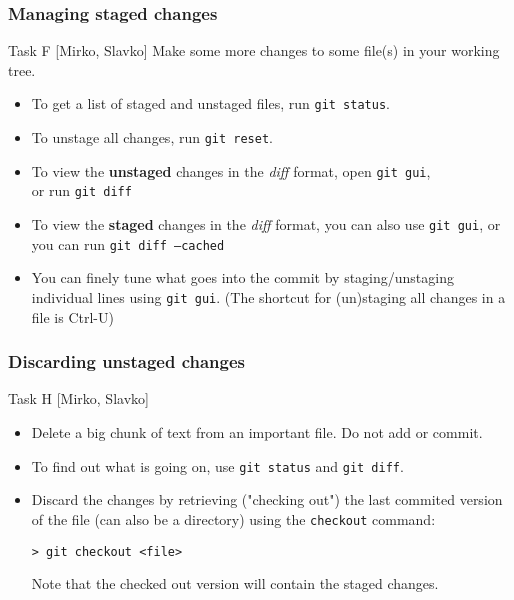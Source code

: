 \begin{frame}

\frametitle{Managing staged changes}

	\begin{block}{Task F [Mirko, Slavko]}
	Make some more changes to some file(s) in your working tree.
	\end{block}
	\begin{itemize}	
	
	\item To get a list of staged and unstaged files, run \texttt{git status}.
	\item To unstage all changes, run \texttt{git reset}.
	\item To view the \textbf{unstaged} changes in the \textit{diff} format, open \texttt{git gui}, 
	\\or run \texttt{git diff}

	\item To view the \textbf{staged} changes in the \textit{diff} format, you can also use \texttt{git gui}, or you can run \texttt{git diff --cached}
	
	\item You can finely tune what goes into the commit by staging/unstaging individual lines using \texttt{git gui}.
	(The shortcut for (un)staging all changes in a file is Ctrl-U)
	\end{itemize}
	
\end{frame}



\begin{frame}[fragile]
	\frametitle{Discarding unstaged changes}
	
	\begin{block}{Task H [Mirko, Slavko]}
	\begin{itemize}
	\item Delete a big chunk of text from an important file. Do not add or commit.
	
	\item To find out what is going on, use \texttt{git status} and \texttt{git diff}.
	\medskip	
    \item Discard the changes by retrieving ("checking out") the last commited version of the file (can also be a directory) using the \texttt{checkout} command:

	\begin{verbatim}
> git checkout <file>
	\end{verbatim}
	
	Note that the checked out version will contain the staged changes.
	\end{itemize}	
	\end{block}
\end{frame}

